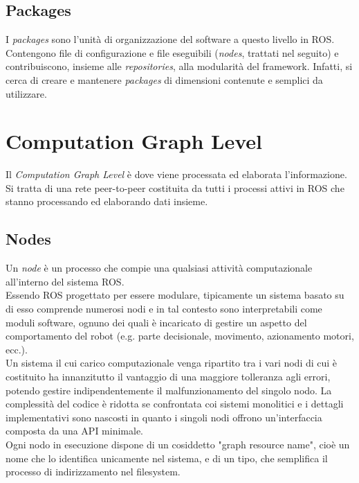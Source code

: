 \subsection{Packages}
I \emph{packages} sono l'unità di organizzazione del software a questo livello in \acs{ROS}. Contengono file di configurazione e file eseguibili (\emph{nodes}, trattati nel seguito) e contribuiscono, insieme alle \emph{repositories}, alla modularità del framework. Infatti, si cerca di creare e mantenere \emph{packages} di dimensioni contenute e semplici da utilizzare.


\section{Computation Graph Level}
Il \emph{Computation Graph Level} è dove viene processata ed elaborata l'informazione. Si tratta di una rete peer-to-peer costituita da tutti i processi attivi in \acs{ROS} che stanno processando ed elaborando dati insieme.

\subsection{Nodes}
Un \emph{node} è un processo che compie una qualsiasi attività computazionale all’interno del sistema \acs{ROS}.\\

Essendo \acs{ROS} progettato per essere modulare, tipicamente un sistema basato su di esso comprende numerosi nodi e in tal contesto sono interpretabili come moduli software, ognuno dei quali è incaricato di gestire un aspetto del comportamento del robot (e.g. parte decisionale, movimento, azionamento motori, ecc.).\\

Un sistema il cui carico computazionale venga ripartito tra i vari nodi di cui è costituito ha innanzitutto il vantaggio di una maggiore tolleranza agli errori, potendo gestire indipendentemente il malfunzionamento del singolo nodo. La complessità del codice è ridotta se confrontata coi sistemi monolitici e i dettagli implementativi sono nascosti in quanto i singoli nodi offrono un’interfaccia composta da una \ac{API} minimale.\\

Ogni nodo in esecuzione dispone di un cosiddetto "graph resource name", cioè un nome che lo identifica unicamente nel sistema, e di un tipo, che semplifica il processo di indirizzamento nel filesystem.

